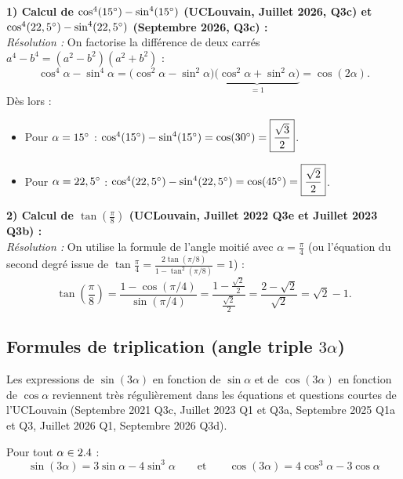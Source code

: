 \begin{exemple}
\textbf{1) Calcul de $\cos^4(15\degree) - \sin^4(15\degree)$ (UCLouvain, Juillet 2026, Q3c) et $\cos^4(22,5\degree) - \sin^4(22,5\degree)$ (Septembre 2026, Q3c) :}\\
\emph{Résolution :} On factorise la différence de deux carrés $a^4 - b^4 = (a^2 - b^2)(a^2 + b^2)$ :
\[
    \cos^4\alpha - \sin^4\alpha = \bigl(\cos^2\alpha - \sin^2\alpha\bigr)\underbrace{\bigl(\cos^2\alpha + \sin^2\alpha\bigr)}_{=1} = \cos(2\alpha).
\]
Dès lors :
\begin{itemize}
    \item Pour $\alpha = 15\degree$ : $\cos^4(15\degree) - \sin^4(15\degree) = \cos(30\degree) = \boxed{\dfrac{\sqrt{3}}{2}}$.
    \item Pour $\alpha = 22,5\degree$ : $\cos^4(22,5\degree) - \sin^4(22,5\degree) = \cos(45\degree) = \boxed{\dfrac{\sqrt{2}}{2}}$.
\end{itemize}

\medskip
\textbf{2) Calcul de $\tan\left(\frac{\pi}{8}\right)$ (UCLouvain, Juillet 2022 Q3e et Juillet 2023 Q3b) :}\\
\emph{Résolution :} On utilise la formule de l'angle moitié avec $\alpha = \frac{\pi}{4}$ (ou l'équation du second degré issue de $\tan\frac{\pi}{4} = \frac{2\tan(\pi/8)}{1-\tan^2(\pi/8)} = 1$) :
\[
    \tan\left(\frac{\pi}{8}\right) = \frac{1 - \cos(\pi/4)}{\sin(\pi/4)} = \frac{1 - \frac{\sqrt{2}}{2}}{\frac{\sqrt{2}}{2}} = \frac{2 - \sqrt{2}}{\sqrt{2}} = \boxed{\sqrt{2} - 1}.
\]
\end{exemple}

\subsection{Formules de triplication (angle triple $3\alpha$)}

Les expressions de $\sin(3\alpha)$ en fonction de $\sin\alpha$ et de $\cos(3\alpha)$ en fonction de $\cos\alpha$ reviennent très régulièrement dans les équations et questions courtes de l'UCLouvain (Septembre 2021 Q3c, Juillet 2023 Q1 et Q3a, Septembre 2025 Q1a et Q3, Juillet 2026 Q1, Septembre 2026 Q3d).

\begin{theoreme}
Pour tout $\alpha \in 2.4$ :
\begin{equation}
    \boxed{\sin(3\alpha) = 3\sin\alpha - 4\sin^3\alpha} \qquad \text{et} \qquad \boxed{\cos(3\alpha) = 4\cos^3\alpha - 3\cos\alpha}
\end{equation}
\end{theoreme}

